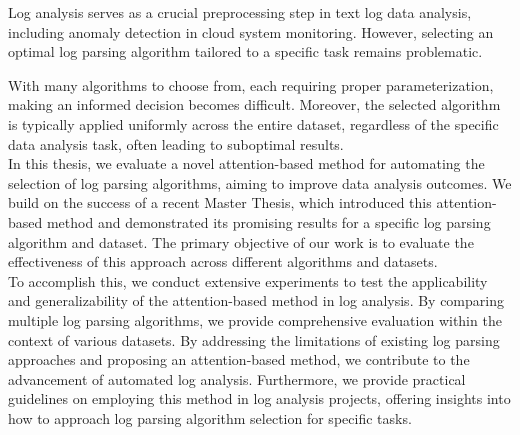 
\Abstract

Log analysis serves as a crucial preprocessing step in text log data analysis, including anomaly detection in cloud system monitoring. However, selecting an optimal log parsing algorithm tailored to a specific task remains problematic.

With many algorithms to choose from, each requiring proper parameterization, making an informed decision becomes difficult. Moreover, the selected algorithm is typically applied uniformly across the entire dataset, regardless of the specific data analysis task, often leading to suboptimal results. \\

In this thesis, we evaluate a novel attention-based method for automating the selection of log parsing algorithms, aiming to improve data analysis outcomes. We build on the success of a recent Master Thesis, which introduced this attention-based method and demonstrated its promising results for a specific log parsing algorithm and dataset. The primary objective of our work is to evaluate the effectiveness of this approach across different algorithms and datasets. \\

To accomplish this, we conduct extensive experiments to test the applicability and generalizability of the attention-based method in log analysis. By comparing multiple log parsing algorithms, we provide comprehensive evaluation within the context of various datasets. 
By addressing the limitations of existing log parsing approaches and proposing an attention-based method, we contribute to the advancement of automated log analysis. Furthermore, we provide practical guidelines on employing this method in log analysis projects, offering insights into how to approach log parsing algorithm selection for specific tasks.